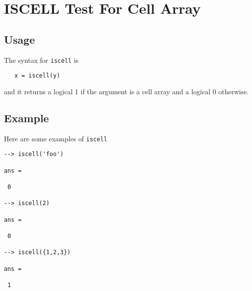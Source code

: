 \section{ISCELL Test For Cell Array}

\subsection{Usage}

The syntax for \verb|iscell| is 
\begin{verbatim}
   x = iscell(y)
\end{verbatim}
and it returns a logical 1 if the argument is a cell array
and a logical 0 otherwise.
\subsection{Example}

Here are some examples of \verb|iscell|
\begin{verbatim}
--> iscell('foo')

ans = 

 0 

--> iscell(2)

ans = 

 0 

--> iscell({1,2,3})

ans = 

 1 
\end{verbatim}
